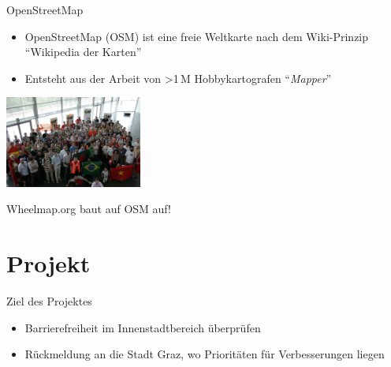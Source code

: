 \documentclass{beamer}
\begin{document}
\begin{frame}{OpenStreetMap}


  \begin{itemize}
        \item OpenStreetMap (OSM) ist eine freie Weltkarte nach dem Wiki-Prinzip ``Wikipedia der Karten''
          \pause
            \item Entsteht aus der Arbeit von \textgreater 1\,M Hobbykartografen ``\emph{Mapper}''
          \end{itemize}

           \begin{center}
              \includegraphics[width=4.5cm]{sotm.jpg}
               \end{center}

             \pause
  Wheelmap.org baut auf OSM auf!

\end{frame}

\section{Projekt}

\begin{frame}{Ziel des Projektes}

    \begin{itemize}
       \item Barrierefreiheit im Innenstadtbereich überprüfen

         \pause

      \vspace{1cm}

      \item Rückmeldung an die Stadt Graz, wo Prioritäten für Verbesserungen liegen
    \end{itemize}


\end{frame}
\end{document}
